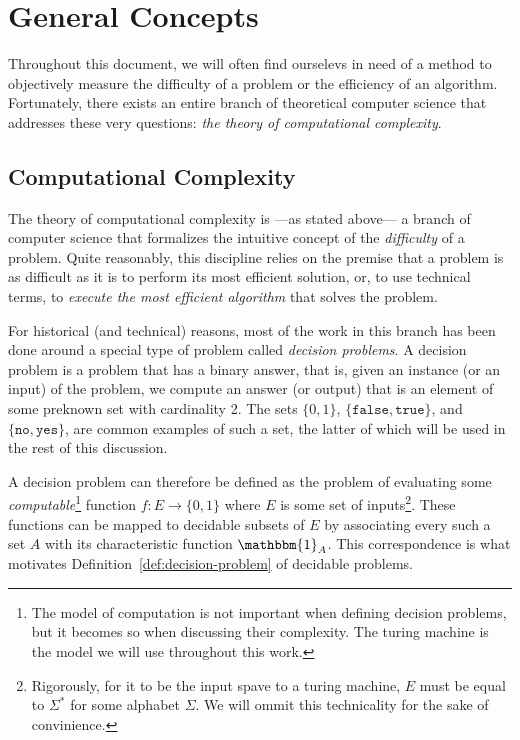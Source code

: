 \chapter{General Concepts}


Throughout this document, we will often find ourselevs in need of a method to objectively measure the difficulty of a problem or the efficiency of an algorithm. Fortunately, there exists an entire branch of theoretical computer science that addresses these very questions: \emph{the theory of computational complexity}.
\section{Computational Complexity}

    The theory of computational complexity is ---as stated above--- a branch of computer science that formalizes the intuitive concept of the \emph{difficulty} of a problem. Quite reasonably, this discipline relies on the premise that a problem is as difficult as it is to perform its most efficient solution, or, to use technical terms, to \emph{execute the most efficient algorithm} that solves the problem.

    For historical (and technical) reasons, most of the work in this branch has been done around a special type of problem called \emph{decision problems}. A decision problem is a problem that has a binary answer, that is, given an instance (or an input) of the problem, we compute an answer (or output) that is an element of some preknown set with cardinality 2. The sets \(\{0, 1\}\), \(\{\texttt{false}, \texttt{true}\}\), and \(\{\texttt{no}, \texttt{yes}\}\), are common examples of such a set, the latter of which will be used in the rest of this discussion.

    A decision problem can therefore be defined as the problem of evaluating some \emph{computable}\footnote{The model of computation is not important when defining decision problems, but it becomes so when discussing their complexity. The turing machine is the model we will use throughout this work.} function \(f: E \rightarrow \{0, 1\}\) where \(E\) is some set of inputs\footnote{Rigorously, for it to be the input spave to a turing machine, \(E\) must be equal to \(\Sigma^\ast\) for some alphabet \(\Sigma\). We will ommit this technicality for the sake of convinience.}. These functions can be mapped to decidable subsets of \(E\) by associating every such a set \(A\) with its characteristic function \(\mathbbm{1}_A\). This correspondence is what motivates Definition~\ref{def:decision-problem} of decidable problems.

